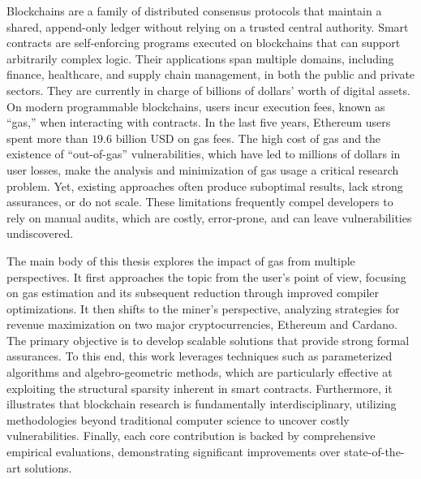 Blockchains are a family of distributed consensus protocols that maintain a shared, append-only ledger without relying on a trusted central authority. Smart contracts are self-enforcing programs executed on blockchains that can support arbitrarily complex logic. Their applications span multiple domains, including finance, healthcare, and supply chain management, in both the public and private sectors. They are currently in charge of billions of dollars' worth of digital assets. On modern programmable blockchains, users incur execution fees, known as ``gas,'' when interacting with contracts. In the last five years, Ethereum users spent more than $19.6$ billion USD on gas fees. The high cost of gas and the existence of ``out-of-gas'' vulnerabilities, which have led to millions of dollars in user losses, make the analysis and minimization of gas usage a critical research problem. Yet, existing approaches often produce suboptimal results, lack strong assurances, or do not scale. These limitations frequently compel developers to rely on manual audits, which are costly, error-prone, and can leave vulnerabilities undiscovered.

The main body of this thesis explores the impact of gas from multiple perspectives. It first approaches the topic from the user's point of view, focusing on gas estimation and its subsequent reduction through improved compiler optimizations. It then shifts to the miner's perspective, analyzing strategies for revenue maximization on two major cryptocurrencies, Ethereum and Cardano.
The primary objective is to develop scalable solutions that provide strong formal assurances. To this end, this work leverages techniques such as parameterized algorithms and algebro-geometric methods, which are particularly effective at exploiting the structural sparsity inherent in smart contracts.
Furthermore, it illustrates that blockchain research is fundamentally interdisciplinary, utilizing methodologies beyond traditional computer science to uncover costly vulnerabilities. Finally, each core contribution is backed by comprehensive empirical evaluations, demonstrating significant improvements over state-of-the-art solutions.


